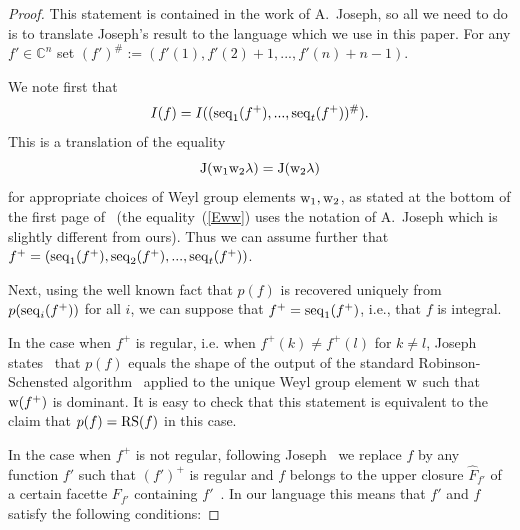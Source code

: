 \documentclass[10pt]{amsart}\oddsidemargin -1mm \evensidemargin -1mm \topmargin -15mm\headheight5mm \headsep 3.5mm \textheight 245mm\textwidth 170mm %
\theoremstyle{definition}\newtheorem{theorem}{Theorem}[section]\newtheorem{lemma}[theorem]{Lemma}\newtheorem{remark}[theorem]{Remark}\newtheorem{proposition}[theorem]{Proposition}\newtheorem{corollary}[theorem]{Corollary}\newtheorem{definition}[theorem]{Definition}\newtheorem{Ex}[theorem]{Example}
\begin{document}
\begin{proof}%
This statement is contained in the work of A.~Joseph, so all we need to do is to translate Joseph's result to the language which we use in this paper. For any $f'\in\mathbb C^n$ set $(f')^\#:= (f'(1), f'(2)+1,..., f'(n)+n-1)$.

We note first that \begin{equation}I(f)=I((\operatorname{\mathrm{seq}}_1(f^+),...,\operatorname{\mathrm{seq}}_t(f^+))^\#).\label{Eww0}\end{equation}  This is a translation of the equality \begin{equation}{\rm J}({\rm w}_1{\rm w}_2\lambda)={\rm J}({\rm w}_2\lambda)\label{Eww}\end{equation} for appropriate choices of Weyl group elements ${\rm w}_1, {\rm w}_2$, as stated at the bottom of the first page of~\cite{Jo3} (the equality~(\ref{Eww}) uses the notation of A.~Joseph which is slightly different from ours). Thus we can assume further that $f^+=(\operatorname{\mathrm{seq}}_1(f^+),\operatorname{\mathrm{seq}}_2(f^+),..., \operatorname{\mathrm{seq}}_t(f^+))$.


Next, using the well known fact that $p(f)$ is recovered uniquely from $p(\operatorname{\mathrm{seq}}_i(f^+))$ for all $i$, we can suppose that $f^+=\operatorname{\mathrm{seq}}_1(f^+)$, i.e., that $f$ is integral.

In the case when $f^+$ is regular, i.e. when $f^+(k)\ne f^+(l)$ for $k\ne l$, Joseph states~\cite[Section 3.3]{Jo1} that $p(f)$ equals the shape of the output of the standard Robinson-Schensted algorithm~\cite[5.1.4, proof~of~Theorem~A]{Knu} applied to the unique Weyl group element ${\rm w}$ such that ${\rm w}(f^+)$ is dominant. It is easy to check that this statement is equivalent to the claim that $p(f)=\operatorname{\mathrm{RS}}(f)$ in this case.

In the case when $f^+$ is not regular, following Joseph~\cite[Section 2.1]{Jo3} we replace $f$ by any function $f'$ such that $(f')^+$ is regular and $f$ belongs to the upper closure $\widehat F_{f'}$ of a certain facette $F_{f'}$ containing $f'$~\cite[Section 2.1]{Jo3}. In our language this means that $f'$ and $f$ satisfy the following conditions:


\end{proof}
\end{document}
